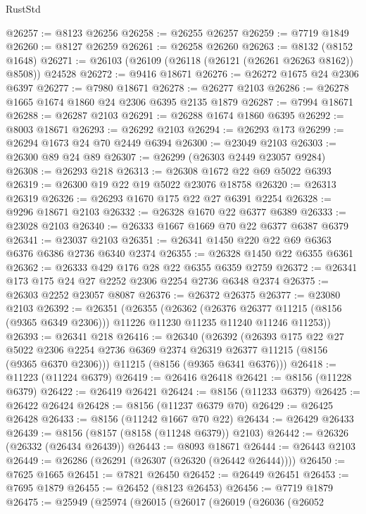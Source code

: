 \begin{lexlean}{RustStd}
\begin{coremodule}
{\begin{coremodule}
{{{{{{{{{{{{{{{{{{{{{{{{{{{{{{{{{{@26257 := @8123 @26256
@26258 := @26255 @26257
@26259 := @7719 @1849
@26260 := @8127 @26259
@26261 := @26258 @26260
@26263 := @8132 (@8152 @1648)
@26271 := @26103 (@26109 (@26118 (@26121 (@26261 @26263 @8162)) @8508)) @24528
@26272 := @9416 @18671
@26276 := @26272 @1675 @24 @2306 @6397
@26277 := @7980 @18671
@26278 := @26277 @2103
@26286 := @26278 @1665 @1674 @1860 @24 @2306 @6395 @2135 @1879
@26287 := @7994 @18671
@26288 := @26287 @2103
@26291 := @26288 @1674 @1860 @6395
@26292 := @8003 @18671
@26293 := @26292 @2103
@26294 := @26293 @173
@26299 := @26294 @1673 @24 @70 @2449 @6394
@26300 := @23049 @2103
@26303 := @26300 @89 @24 @89
@26307 := @26299 (@26303 @2449 @23057 @9284)
@26308 := @26293 @218
@26313 := @26308 @1672 @22 @69 @5022 @6393
@26319 := @26300 @19 @22 @19 @5022 @23076 @18758
@26320 := @26313 @26319
@26326 := @26293 @1670 @175 @22 @27 @6391 @2254
@26328 := @9296 @18671 @2103
@26332 := @26328 @1670 @22 @6377 @6389
@26333 := @23028 @2103
@26340 := @26333 @1667 @1669 @70 @22 @6377 @6387 @6379
@26341 := @23037 @2103
@26351 := @26341 @1450 @220 @22 @69 @6363 @6376 @6386 @2736 @6340 @2374
@26355 := @26328 @1450 @22 @6355 @6361
@26362 := @26333 @429 @176 @28 @22 @6355 @6359 @2759
@26372 := @26341 @173 @175 @24 @27 @2252 @2306 @2254 @2736 @6348 @2374
@26375 := @26303 @2252 @23057 @8087
@26376 := @26372 @26375
@26377 := @23080 @2103
@26392 := @26351
    (@26355
      (@26362
        (@26376 @26377 @11215 (@8156 (@9365 @6349 @2306)))
        @11226
        @11230
        @11235
        @11240
        @11246
        @11253))
@26393 := @26341 @218
@26416 := @26340
    (@26392
      (@26393
        @175
        @22
        @27
        @5022
        @2306
        @2254
        @2736
        @6369
        @2374
        @26319
        @26377
        @11215
        (@8156 (@9365 @6370 @2306)))
      @11215
      (@8156 (@9365 @6341 @6376)))
@26418 := @11223 (@11224 @6379)
@26419 := @26416 @26418
@26421 := @8156 (@11228 @6379)
@26422 := @26419 @26421
@26424 := @8156 (@11233 @6379)
@26425 := @26422 @26424
@26428 := @8156 (@11237 @6379 @70)
@26429 := @26425 @26428
@26433 := @8156 (@11242 @1667 @70 @22)
@26434 := @26429 @26433
@26439 := @8156 (@8157 (@8158 (@11248 @6379)) @2103)
@26442 := @26326 (@26332 (@26434 @26439))
@26443 := @8093 @18671
@26444 := @26443 @2103
@26449 := @26286 (@26291 (@26307 (@26320 (@26442 @26444))))
@26450 := @7625 @1665
@26451 := @7821 @26450
@26452 := @26449 @26451
@26453 := @7695 @1879
@26455 := @26452 (@8123 @26453)
@26456 := @7719 @1879
@26475 := @25949
    (@25974
      (@26015
        (@26017
          (@26019
            (@26036
              (@26052
}}}}}}}}}}}}}}}}}}}}}}}}}}}}}}}}}}
\end{coremodule}}
\end{coremodule}
\end{lexlean}
